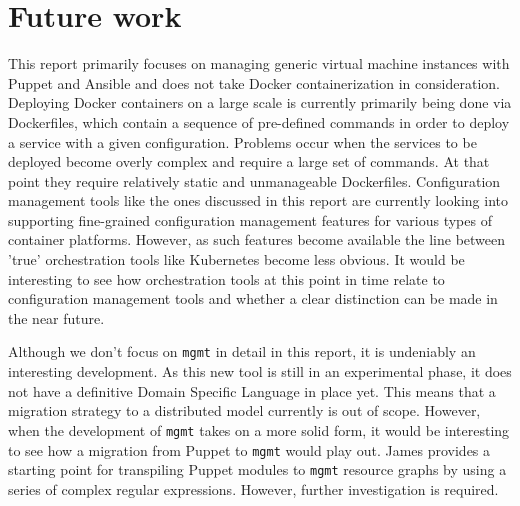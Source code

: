 \section{Future work}\label{sec:futurework}
This report primarily focuses on managing generic virtual machine instances with Puppet and Ansible and does not take Docker containerization in consideration. Deploying Docker containers on a large scale is currently primarily being done via Dockerfiles, which contain a sequence of pre-defined commands in order to deploy a service with a given configuration. Problems occur when the services to be deployed become overly complex and require a large set of commands. At that point they require relatively static and unmanageable Dockerfiles. Configuration management tools like the ones discussed in this report are currently looking into supporting fine-grained configuration management features for various types of container platforms. However, as such features become available the line between 'true' orchestration tools like Kubernetes \cite{kubernetes_2016} become less obvious. It would be interesting to see how orchestration tools at this point in time relate to configuration management tools and whether a clear distinction can be made in the near future.

Although we don't focus on \texttt{mgmt} in detail in this report, it is undeniably an interesting development. As this new tool is still in an experimental phase, it does not have a definitive Domain Specific Language in place yet. This means that a migration strategy to a distributed model currently is out of scope. However, when the development of \texttt{mgmt} takes on a more solid form, it would be interesting to see how a migration from Puppet to \texttt{mgmt} would play out. James \cite{frank_2016} provides a starting point for transpiling Puppet modules to \texttt{mgmt} resource graphs by using a series of complex regular expressions. However, further investigation is required.
